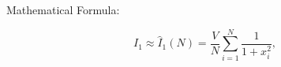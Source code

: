 \documentclass{article}
\begin{document}
Mathematical Formula:

\[
I_1 \approx \hat{I}_1(N) =  \frac{V}{N} \sum_{i=1}^N \frac{1}{1 + x_i^2},
\]
\end{document}

